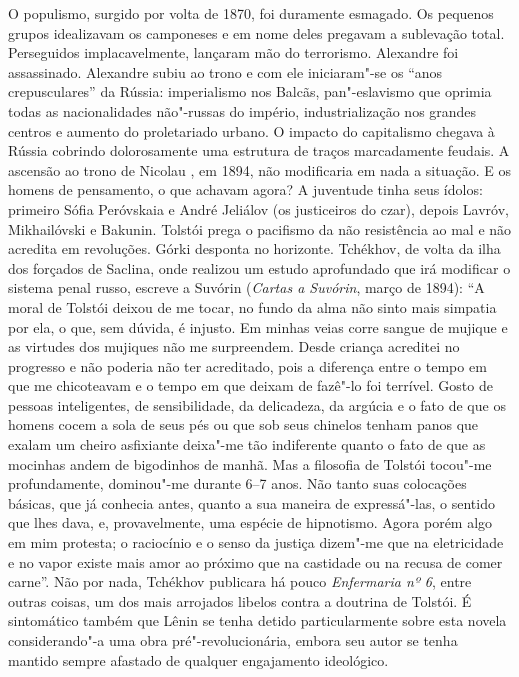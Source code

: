{{O populismo, surgido por volta de 1870, foi duramente esmagado. Os
pequenos grupos idealizavam os camponeses e em nome deles pregavam a
sublevação total. Perseguidos implacavelmente, lançaram mão do
terrorismo. Alexandre  foi assassinado. Alexandre  subiu ao trono e
com ele iniciaram"-se os ``anos crepusculares'' da Rússia: imperialismo
nos Balcãs, pan"-eslavismo que oprimia todas as nacionalidades não"-russas
do império, industrialização nos grandes centros e aumento do
proletariado urbano. O impacto do capitalismo chegava à Rússia cobrindo
dolorosamente uma estrutura de traços marcadamente feudais. A ascensão
ao trono de Nicolau , em 1894, não modificaria em nada a situação. E os
homens de pensamento, o que achavam agora? A juventude tinha seus ídolos:
primeiro Sófia Peróvskaia e André Jeliálov (os justiceiros do czar),
depois Lavróv, Mikhailóvski e Bakunin. Tolstói prega o pacifismo da não
resistência ao mal e não acredita em revoluções. Górki desponta no
horizonte. Tchékhov, de volta da ilha dos forçados de Saclina, onde realizou um
estudo aprofundado que irá modificar o sistema penal russo, escreve
a Suvórin (\emph{Cartas a Suvórin}, março de 1894): ``A moral de Tolstói deixou de me
tocar, no fundo da alma não sinto mais simpatia por ela, o que, sem
dúvida, é injusto. Em minhas veias corre sangue de mujique e as virtudes
dos mujiques não me surpreendem. Desde criança acreditei no progresso e
não poderia não ter acreditado, pois a diferença entre o tempo em que me
chicoteavam e o tempo em que deixam de fazê"-lo foi terrível. Gosto de
pessoas inteligentes, de sensibilidade, da delicadeza, da argúcia e o
fato de que os homens cocem a sola de seus pés ou que sob seus chinelos
tenham panos que exalam um cheiro asfixiante deixa"-me tão indiferente
quanto o fato de que as mocinhas andem de bigodinhos de manhã. Mas a
filosofia de Tolstói tocou"-me profundamente, dominou"-me durante 6--7
anos. Não tanto suas colocações básicas, que já conhecia antes, quanto a
sua maneira de expressá"-las, o sentido que lhes dava, e, provavelmente,
uma espécie de hipnotismo. Agora porém algo em mim protesta; o
raciocínio e o senso da justiça dizem"-me que na eletricidade e no vapor
existe mais amor ao próximo que na castidade ou na recusa de comer
carne''. Não por nada, Tchékhov publicara há pouco \emph{Enfermaria nº
6}, entre outras coisas, um dos mais arrojados libelos contra a doutrina
de Tolstói. É sintomático também que Lênin se tenha detido
particularmente sobre esta novela considerando"-a uma obra
pré"-revolucionária, embora seu autor se tenha mantido sempre afastado de
qualquer engajamento ideológico.

}}
